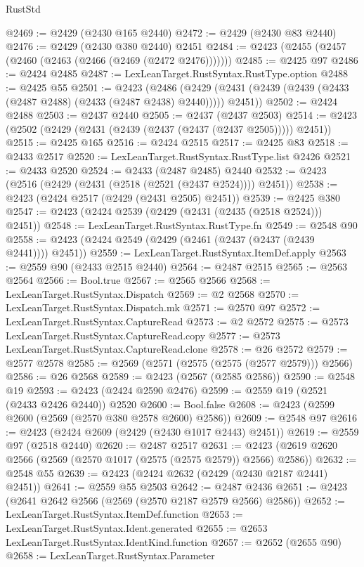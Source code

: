 \begin{lexlean}{RustStd}
\begin{coremodule}
@2469 := @2429 (@2430 @165 @2440)
@2472 := @2429 (@2430 @83 @2440)
@2476 := @2429 (@2430 @380 @2440) @2451
@2484 := @2423 (@2455 (@2457 (@2460 (@2463 (@2466 (@2469 (@2472 @2476)))))))
@2485 := @2425 @97
@2486 := @2424 @2485
@2487 := LexLeanTarget.RustSyntax.RustType.option
@2488 := @2425 @55
@2501 := @2423
    (@2486 (@2429 (@2431 (@2439 (@2439 (@2433 (@2487 @2488) (@2433 (@2487 @2438) @2440))))) @2451))
@2502 := @2424 @2488
@2503 := @2437 @2440
@2505 := @2437 (@2437 @2503)
@2514 := @2423 (@2502 (@2429 (@2431 (@2439 (@2437 (@2437 (@2437 @2505))))) @2451))
@2515 := @2425 @165
@2516 := @2424 @2515
@2517 := @2425 @83
@2518 := @2433 @2517
@2520 := LexLeanTarget.RustSyntax.RustType.list @2426
@2521 := @2433 @2520
@2524 := @2433 (@2487 @2485) @2440
@2532 := @2423 (@2516 (@2429 (@2431 (@2518 (@2521 (@2437 @2524)))) @2451))
@2538 := @2423 (@2424 @2517 (@2429 (@2431 @2505) @2451))
@2539 := @2425 @380
@2547 := @2423 (@2424 @2539 (@2429 (@2431 (@2435 (@2518 @2524))) @2451))
@2548 := LexLeanTarget.RustSyntax.RustType.fn
@2549 := @2548 @90
@2558 := @2423 (@2424 @2549 (@2429 (@2461 (@2437 (@2437 (@2439 @2441)))) @2451))
@2559 := LexLeanTarget.RustSyntax.ItemDef.apply
@2563 := @2559 @90 (@2433 @2515 @2440)
@2564 := @2487 @2515
@2565 := @2563 @2564
@2566 := Bool.true
@2567 := @2565 @2566
@2568 := LexLeanTarget.RustSyntax.Dispatch
@2569 := @2 @2568
@2570 := LexLeanTarget.RustSyntax.Dispatch.mk
@2571 := @2570 @97
@2572 := LexLeanTarget.RustSyntax.CaptureRead
@2573 := @2 @2572
@2575 := @2573 LexLeanTarget.RustSyntax.CaptureRead.copy
@2577 := @2573 LexLeanTarget.RustSyntax.CaptureRead.clone
@2578 := @26 @2572
@2579 := @2577 @2578
@2585 := @2569 (@2571 (@2575 (@2575 (@2577 @2579))) @2566)
@2586 := @26 @2568
@2589 := @2423 (@2567 (@2585 @2586))
@2590 := @2548 @19
@2593 := @2423 (@2424 @2590 @2476)
@2599 := @2559 @19 (@2521 (@2433 @2426 @2440)) @2520
@2600 := Bool.false
@2608 := @2423 (@2599 @2600 (@2569 (@2570 @380 @2578 @2600) @2586))
@2609 := @2548 @97
@2616 := @2423 (@2424 @2609 (@2429 (@2430 @1017 @2443) @2451))
@2619 := @2559 @97 (@2518 @2440)
@2620 := @2487 @2517
@2631 := @2423 (@2619 @2620 @2566 (@2569 (@2570 @1017 (@2575 (@2575 @2579)) @2566) @2586))
@2632 := @2548 @55
@2639 := @2423 (@2424 @2632 (@2429 (@2430 @2187 @2441) @2451))
@2641 := @2559 @55 @2503
@2642 := @2487 @2436
@2651 := @2423 (@2641 @2642 @2566 (@2569 (@2570 @2187 @2579 @2566) @2586))
@2652 := LexLeanTarget.RustSyntax.ItemDef.function
@2653 := LexLeanTarget.RustSyntax.Ident.generated
@2655 := @2653 LexLeanTarget.RustSyntax.IdentKind.function
@2657 := @2652 (@2655 @90)
@2658 := LexLeanTarget.RustSyntax.Parameter

\end{coremodule}
\end{lexlean}

